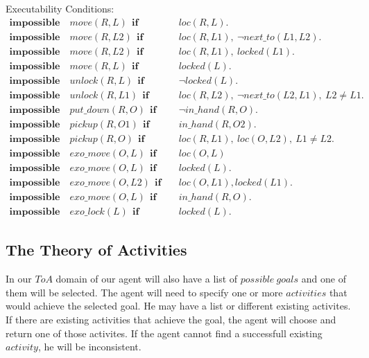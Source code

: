 \documentclass[11pt, oneside]{article}
\begin{document}
Executability Conditions:
\begin{align*}
  \mathbf{impossible}\quad move(R, L)~~\mathbf{if}&\quad loc(R,L).\\
  \mathbf{impossible}\quad move(R, L2)~~\mathbf{if}&\quad loc(R,L1),~\neg next\_to(L1,L2).\\
  \mathbf{impossible}\quad move(R,L2)~~\mathbf{if}&\quad loc(R,L1),~locked(L1).\\
  \mathbf{impossible}\quad move(R,L)~~\mathbf{if}&\quad locked(L).\\
  \mathbf{impossible}\quad unlock(R, L)~~\mathbf{if}&\quad \neg locked(L).\\
  \mathbf{impossible}\quad unlock(R, L1)~~\mathbf{if}&\quad loc(R,L2),~\neg next\_to(L2,L1),~L2\neq L1.\\
  \mathbf{impossible}\quad put\_down(R,O)~~\mathbf{if}&\quad \neg in\_hand(R,O).\\
  \mathbf{impossible}\quad pickup(R,O1)~~\mathbf{if}&\quad in\_hand(R,O2).\\
  \mathbf{impossible}\quad pickup(R,O)~~\mathbf{if}&\quad loc(R,L1),~loc(O,L2),~L1 \neq L2.\\
  \mathbf{impossible}\quad exo\_move(O,L)~~\mathbf{if}&\quad loc(O,L)\\
  \mathbf{impossible}\quad exo\_move(O,L)~~\mathbf{if}&\quad locked(L).\\
  \mathbf{impossible}\quad exo\_move(O,L2)~~\mathbf{if}&\quad loc(O,L1), locked(L1).\\
  \mathbf{impossible}\quad exo\_move(O,L)~~\mathbf{if}&\quad in\_hand(R,O).\\
  \mathbf{impossible}\quad exo\_lock(L)~~\mathbf{if}&\quad locked(L).
\end{align*}





\subsection{The Theory of Activities}
In our $ToA$ domain of our agent will also have a list of $possible\ goals$ and one of them will be selected. The agent will need to specify one or more $activities$ that would achieve the selected goal. He may have a list or different existing activites. If there are existing activities that achieve the goal, the agent will choose and return one of those activites. If the agent cannot find a successfull existing $activity$, he will be inconsistent. 
\end{document}
